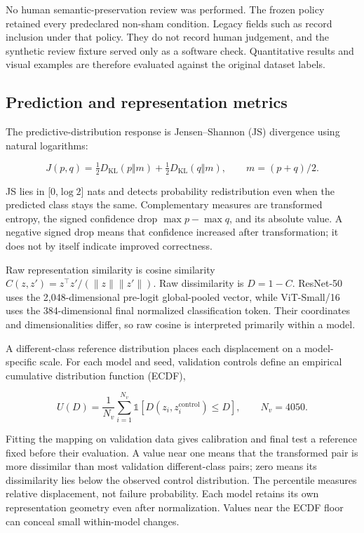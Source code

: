 No human semantic-preservation review was performed. The frozen policy retained every predeclared non-sham condition. Legacy fields such as  record inclusion under that policy. They do not record human judgement, and the synthetic review fixture served only as a software check. Quantitative results and visual examples are therefore evaluated against the original dataset labels.

\subsection{Prediction and representation metrics}

The predictive-distribution response is Jensen--Shannon (JS) divergence using natural logarithms:

\[
J(p,q)=\tfrac12 D_{\mathrm{KL}}(p\Vert m)
       +\tfrac12 D_{\mathrm{KL}}(q\Vert m),
\qquad m=(p+q)/2.
\]

JS lies in [0,\(\log 2\)] nats and detects probability redistribution even when the predicted class stays the same. Complementary measures are transformed entropy, the signed confidence drop \(\max p-\max q\), and its absolute value. A negative signed drop means that confidence increased after transformation; it does not by itself indicate improved correctness.

Raw representation similarity is cosine similarity \(C(z,z')=z^\top z'/(\lVert z\rVert\lVert z'\rVert)\). Raw dissimilarity is \(D=1-C\). ResNet-50 uses the 2,048-dimensional pre-logit global-pooled vector, while ViT-Small/16 uses the 384-dimensional final normalized classification token. Their coordinates and dimensionalities differ, so raw cosine is interpreted primarily within a model.

A different-class reference distribution places each displacement on a model-specific scale. For each model and seed, validation controls define an empirical cumulative distribution function (ECDF),

\[
U(D)=\frac{1}{N_v}\sum_{i=1}^{N_v}
 \mathbb{1}[D(z_i,z_i^{\mathrm{control}})\le D],
\qquad N_v=4050.
\]

Fitting the mapping on validation data gives calibration and final test a reference fixed before their evaluation. A value near one means that the transformed pair is more dissimilar than most validation different-class pairs; zero means its dissimilarity lies below the observed control distribution. The percentile measures relative displacement, not failure probability. Each model retains its own representation geometry even after normalization. Values near the ECDF floor can conceal small within-model changes.

